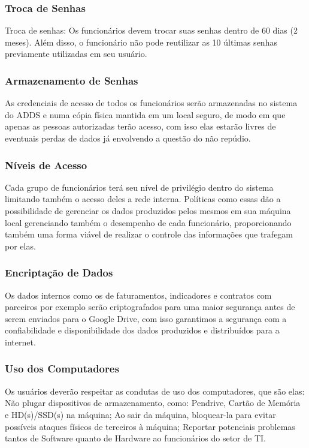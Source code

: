 \documentclass[12pt]{article}
\begin{document}
\subsubsection{Troca de Senhas}
Troca de senhas: Os funcionários devem trocar suas senhas dentro de 60 dias (2 meses). Além disso, o funcionário não pode reutilizar as 10 últimas senhas previamente utilizadas em seu usuário.

\subsubsection{Armazenamento de Senhas}
As credenciais de acesso de todos os funcionários serão armazenadas
no sistema do ADDS e numa cópia física mantida em um local seguro, de modo em que apenas as pessoas autorizadas terão acesso, com isso elas estarão livres de eventuais perdas de dados já envolvendo a questão do não repúdio.

\subsubsection{Níveis de Acesso}
Cada grupo de funcionários terá seu nível de privilégio dentro do sistema limitando também o acesso deles a rede interna. Políticas como essas dão a possibilidade de gerenciar os dados produzidos pelos mesmos em sua máquina local gerenciando também o desempenho de cada funcionário, proporcionando também uma forma viável de realizar o controle das informações que trafegam por elas.

\subsubsection{Encriptação de Dados}
Os dados internos como os de faturamentos, indicadores e contratos com parceiros por exemplo serão criptografados para uma maior segurança antes de serem enviados para o Google Drive, com isso garantimos a segurança com a confiabilidade e disponibilidade dos dados produzidos e distribuídos para a internet.

\subsubsection{Uso dos Computadores}
Os usuários deverão respeitar as condutas de uso dos computadores, que são elas: Não plugar dispositivos de armazenamento, como: Pendrive, Cartão de Memória e HD(s)/SSD(s) na máquina; Ao sair da máquina, bloquear-la para evitar possíveis ataques físicos de terceiros à máquina; Reportar potenciais problemas tantos de Software quanto de Hardware ao funcionários do setor de TI.
\end{document}

